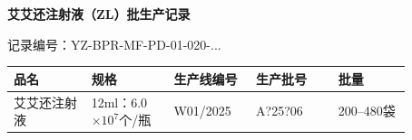 \documentclass[UTF8,10pt,a4paper,fontset=fandol]{ctexart}
\newcommand{\fieldvalue}[1]{#1}
\newcommand{\handwritten}[1]{#1}
\begin{document}
\newpage

\begin{center}
\textbf{艾艾还注射液（ZL）批生产记录}
\end{center}

记录编号：YZ-BPR-MF-PD-01-020-...

\begin{tabular}{|p{0.17\linewidth}|p{0.18\linewidth}|p{0.18\linewidth}|p{0.18\linewidth}|p{0.16\linewidth}|}
\hline
品名 & 规格 & 生产线编号 & 生产批号 & 批量 \\
\hline
\fieldvalue{艾艾还注射液} &
\fieldvalue{12ml：6.0$\times 10^{7}$个/瓶} &
\fieldvalue{\handwritten{W01/2025}} &
\fieldvalue{\handwritten{A?25?06}} &
\fieldvalue{200--480袋} \\
\hline
\end{tabular}
\end{document}
